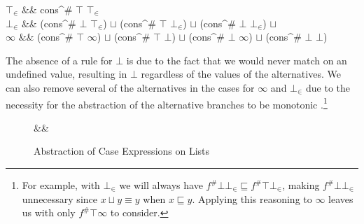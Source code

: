 \begin{haskell}
    \(\top_{\in}\) &\to& cons^{\#} \(\top\) \(\top_{\in}\)              \\  
    \(\bot_{\in}\) &\to& (cons^{\#} \(\bot\) \(\top_{\in}\)) \(\sqcup\)
                         (cons^{\#} \(\top\) \(\bot_{\in}\)) \(\sqcup\)
                         (cons^{\#} \(\bot\) \(\bot_{\in}\)) \(\sqcup\) \\  
    \(\infty\)     &\to& (cons^{\#} \(\top\) \(\infty\))     \(\sqcup\)
                         (cons^{\#} \(\top\) \(\bot\))       \(\sqcup\)
                         (cons^{\#} \(\bot\) \(\infty\))      \(\sqcup\)
                         (cons^{\#} \(\bot\) \(\bot\))
\end{haskell}

The absence of a rule for $\bot$ is due to the fact that we would never match
on an undefined value, resulting in $\bot$ regardless of the values of the
alternatives. We can also remove several of the alternatives in the cases for
$\infty$ and $\bot_{\in}$ due to the necessity for the abstraction of the
alternative branches to be monotonic \citep{wadler1987strictness}.\footnote{For
example, with \(\bot_{\in}\) we will always have \(f^{\#} \bot \bot_{\in}
\sqsubseteq f^{\#} \top \bot_{\in}\), making \(f^{\#} \bot \bot_{\in}\)
unnecessary since \(x \sqcup y \equiv y\) when \(x \sqsubseteq y\). Applying
this reasoning to \(\infty\) leaves us with only \(f^{\#} \top \infty\) to
consider.}

\begin{figure}[t!]
\begin{haskell*}
 \hasphi && \\
 
\end{haskell*}
\caption{Abstraction of Case Expressions on Lists}
\label{fig:absCase}
\end{figure}


